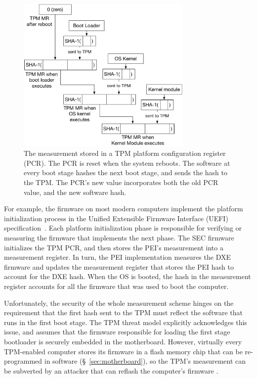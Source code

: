 \begin{figure}[hbt]
  \centering
  \includegraphics[width=85mm]{figures/tpm_measurement.pdf}
  \caption{
    The measurement stored in a TPM platform configuration register (PCR). The
    PCR is reset when the system reboots. The software at every boot stage
    hashes the next boot stage, and sends the hash to the TPM. The PCR's new
    value incorporates both the old PCR value, and the new software hash.
  }
  \label{fig:tpm_measurement}
\end{figure}

For example, the firmware on most modern computers implement the platform
initialization process in the Unified Extensible Firmware Interface (UEFI)
specification~\cite{forum2015uefi}. Each platform initialization phase is
responsible for verifying or measuring the firmware that implements the next
phase. The SEC firmware initializes the TPM PCR, and then stores the PEI's
measurement into a measurement register. In turn, the PEI implementation
measures the DXE firmware and updates the measurement register that stores the
PEI hash to account for the DXE hash. When the OS is booted, the hash in the
measurement register accounts for all the firmware that was used to boot the
computer.

Unfortunately, the security of the whole measurement scheme hinges on the
requirement that the first hash sent to the TPM must reflect the software that
runs in the first boot stage. The TPM threat model explicitly acknowledges this
issue, and assumes that the firmware responsible for loading the first stage
bootloader is securely embedded in the motherboard. However, virtually every
TPM-enabled computer stores its firmware in a flash memory chip that can be
re-programmed in software (\S~\ref{sec:motherboard}), so the TPM's measurement
can be subverted by an attacker that can reflash the computer's firmware
\cite{butterworth2013bios}.

